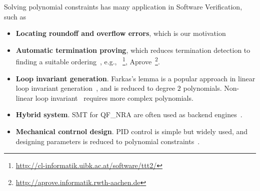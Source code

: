 %
Solving polynomial constraints has many application in Software Verification, such as 
\begin{itemize}
\item {\bf Locating roundoff and overflow errors}, 
which is our motivation~\cite{Ngoc:2009:ORE:1685167.1685421,Ngoc:2010:CRE:1858996.1859056}

\item {\bf Automatic termination proving}, 
which reduces termination detection to finding a suitable ordering~\cite{Lucas:2008:CCS:1361735.1361760}, 
e.g., \TTTT~\footnote{\url{http://cl-informatik.uibk.ac.at/software/ttt2/}}, 
Aprove~\footnote{\url{http://aprove.informatik.rwth-aachen.de}}. 

\item {\bf Loop invariant generation}. 
Farkas's lemma is a popular approach in linear loop invariant generation~\cite{Colon}, 
and is reduced to degree $2$ polynomials. 
Non-linear loop invariant~\cite{Sankaranarayanan:2004:NLI:982962.964028} requires more complex polynomials.

\item {\bf Hybrid system}. SMT for QF\_NRA are often used as backend engines~\cite{Sankaranarayanan04constructinginvariants}. 

\item {\bf Mechanical contrnol design}. 
PID control is simple but widely used, and designing parameters is 
reduced to polynomial constraints~\cite{control}. 
\end{itemize}	

